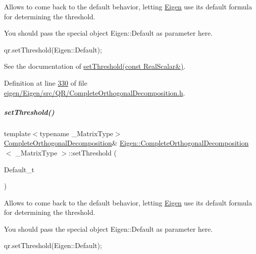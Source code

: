 Allows to come back to the default behavior, letting \hyperlink{namespace_eigen}{Eigen} use its default formula for determining the threshold.

You should pass the special object Eigen\+::\+Default as parameter here. 
\begin{DoxyCode}
qr.setThreshold(Eigen::Default); 
\end{DoxyCode}


See the documentation of \hyperlink{group___q_r___module_aa9c9f7cbde9d58ca5552381b70ad8d82}{set\+Threshold(const Real\+Scalar\&)}. 

Definition at line \hyperlink{eigen_2_eigen_2src_2_q_r_2_complete_orthogonal_decomposition_8h_source_l00330}{330} of file \hyperlink{eigen_2_eigen_2src_2_q_r_2_complete_orthogonal_decomposition_8h_source}{eigen/\+Eigen/src/\+Q\+R/\+Complete\+Orthogonal\+Decomposition.\+h}.

\mbox{\label{group___q_r___module_a27c8da71874be7a64d6723bd0cae9f4f}} 
\subparagraph{\texorpdfstring{set\+Threshold()}{setThreshold()}\hspace{0.1cm}{\footnotesize\ttfamily [4/4]}}
{\footnotesize\ttfamily template$<$typename \+\_\+\+Matrix\+Type$>$ \\
\hyperlink{group___q_r___module_class_eigen_1_1_complete_orthogonal_decomposition}{Complete\+Orthogonal\+Decomposition}\& \hyperlink{group___q_r___module_class_eigen_1_1_complete_orthogonal_decomposition}{Eigen\+::\+Complete\+Orthogonal\+Decomposition}$<$ \+\_\+\+Matrix\+Type $>$\+::set\+Threshold (\begin{DoxyParamCaption}\item[{Default\+\_\+t}]{ }\end{DoxyParamCaption})\hspace{0.3cm}{\ttfamily [inline]}}

Allows to come back to the default behavior, letting \hyperlink{namespace_eigen}{Eigen} use its default formula for determining the threshold.

You should pass the special object Eigen\+::\+Default as parameter here. 
\begin{DoxyCode}
qr.setThreshold(Eigen::Default); 
\end{DoxyCode}


